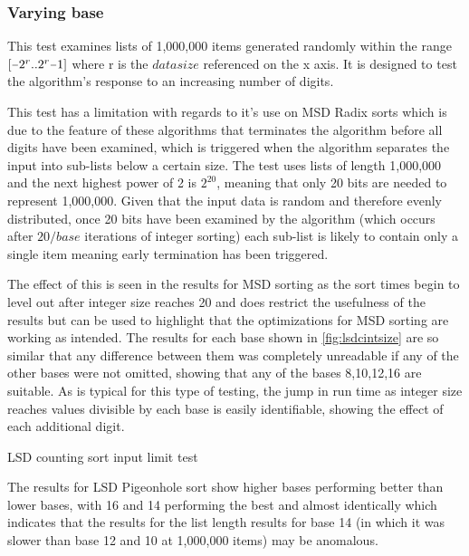 \documentclass[12pt]{article}
\newcommand{\minus}{\scalebox{0.75}[1.0]{$-$}}
\begin{document}
	\subsubsection{Varying base}
	\label{sssec:varyingbase}
	This test examines lists of 1,000,000 items generated randomly within the range $[\minus2^r..2^r\minus1]$ where r is the $data$\textunderscore $size$ referenced on the x axis. It is designed to test the algorithm's response to an increasing number of digits.
	\par
	This test has a limitation with regards to it's use on MSD Radix sorts which is due to the feature of these algorithms that terminates the algorithm before all digits have been examined, which is triggered when the algorithm separates the input into sub-lists below a certain size. The test uses lists of length 1,000,000 and the next highest power of 2 is $2^{20}$, meaning that only 20 bits are needed to represent 1,000,000. Given that the input data is random and therefore evenly distributed, once 20 bits have been examined by the algorithm (which occurs after $20/{base}$ iterations of integer sorting) each sub-list is likely to contain only a single item meaning early termination has been triggered.
	\par
	The effect of this is seen in the results for MSD sorting as the sort times begin to level out after integer size reaches 20 and does restrict the usefulness of the results but can be used to highlight that the optimizations for MSD sorting are working as intended.
	\pagebreak
	The results for each base shown in \autoref{fig:lsdcintsize} are so similar that any difference between them was completely unreadable if any of the other bases were not omitted, showing that any of the bases 8,10,12,16 are suitable. As is typical for this type of testing, the jump in run time as integer size reaches values divisible by each base is easily identifiable, showing the effect of each additional digit.
	\begin{table}[h]
		\centering
		\captionsetup{type=figure}
			\caption{LSD counting sort input limit test\label{fig:lsdcintsize}}
	\end{table}
	The results for LSD Pigeonhole sort show higher bases performing better than lower bases, with 16 and 14 performing the best and almost identically which indicates that the results for the list length results for base 14 (in which it was slower than base 12 and 10 at 1,000,000 items) may be anomalous.
\end{document}

